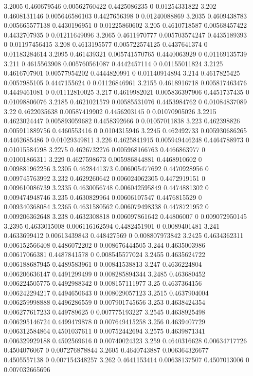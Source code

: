 {3.2005 0.460679546 0.00562760422 0.4425086235 0 0.01254331822
3.202 0.4608131146 0.005646586103 0.4427656398 0 0.01240088869
3.2035 0.4609438783 0.005665577138 0.4430196951 0 0.01225860602
3.205 0.4610718587 0.00568457422 0.4432707935 0 0.01211649096
3.2065 0.4611970777 0.005703574247 0.4435189393 0 0.01197456415
3.208 0.4613195577 0.005722574125 0.4437641374 0 0.01183284614
3.2095 0.461439321 0.005741570765 0.4440063929 0 0.01169135739
3.211 0.4615563908 0.005760561087 0.4442457114 0 0.01155011824
3.2125 0.4616707901 0.00577954202 0.4444820991 0 0.01140914894
3.214 0.4617825425 0.0057985105 0.4447155624 0 0.01126846961
3.2155 0.4618916718 0.005817463476 0.4449461081 0 0.01112810025
3.217 0.4619982021 0.005836397906 0.4451737435 0 0.01098806076
3.2185 0.4621021579 0.00585531076 0.4453984762 0 0.01084837089
3.22 0.4622035638 0.00587419902 0.4456203145 0 0.01070905026
3.2215 0.4623024447 0.005893059682 0.4458392666 0 0.01057011838
3.223 0.462398826 0.005911889756 0.4460553416 0 0.0104315946
3.2245 0.462492733 0.005930686265 0.4462685486 0 0.01029349811
3.226 0.4625841915 0.005949446248 0.4464788973 0 0.01015584798
3.2275 0.4626732276 0.005968166763 0.4466863977 0 0.01001866311
3.229 0.4627598673 0.005986844881 0.4468910602 0 0.009881962256
3.2305 0.4628441373 0.006005477692 0.4470928956 0 0.009745763992
3.232 0.4629260642 0.006024062305 0.4472919151 0 0.009610086739
3.2335 0.4630056748 0.006042595849 0.4474881302 0 0.009474948746
3.235 0.4630829964 0.00606107547 0.4476815529 0 0.009340368084
3.2365 0.4631580562 0.006079498338 0.4478721952 0 0.009206362648
3.238 0.4632308818 0.006097861642 0.44806007 0 0.009072950145
3.2395 0.4633015008 0.006116162594 0.4482451901 0 0.0089401481
3.241 0.4633699412 0.00613439843 0.448427569 0 0.008807973842
3.2425 0.4634362311 0.006152566408 0.4486072202 0 0.008676444505
3.244 0.4635003986 0.00617066381 0.4487841578 0 0.008545577024
3.2455 0.4635624722 0.006188687945 0.4489583961 0 0.00841538813
3.247 0.4636224804 0.006206636147 0.4491299499 0 0.008285894344
3.2485 0.463680452 0.006224505775 0.4492988342 0 0.008157111977
3.25 0.4637364156 0.006242294217 0.4494650643 0 0.008029057123
3.2515 0.4637904004 0.006259998888 0.4496286559 0 0.007901745656
3.253 0.4638424354 0.006277617233 0.449789625 0 0.007775193227
3.2545 0.4638925498 0.006295146724 0.4499479878 0 0.007649415258
3.256 0.4639407729 0.006312584864 0.4501037611 0 0.00752442694
3.2575 0.4639871341 0.006329929188 0.4502569616 0 0.00740024323
3.259 0.4640316628 0.00634717726 0.4504076067 0 0.007276878844
3.2605 0.4640743887 0.006364326677 0.4505557138 0 0.007154348257
3.262 0.4641153414 0.00638137507 0.4507013006 0 0.007032665696
}
